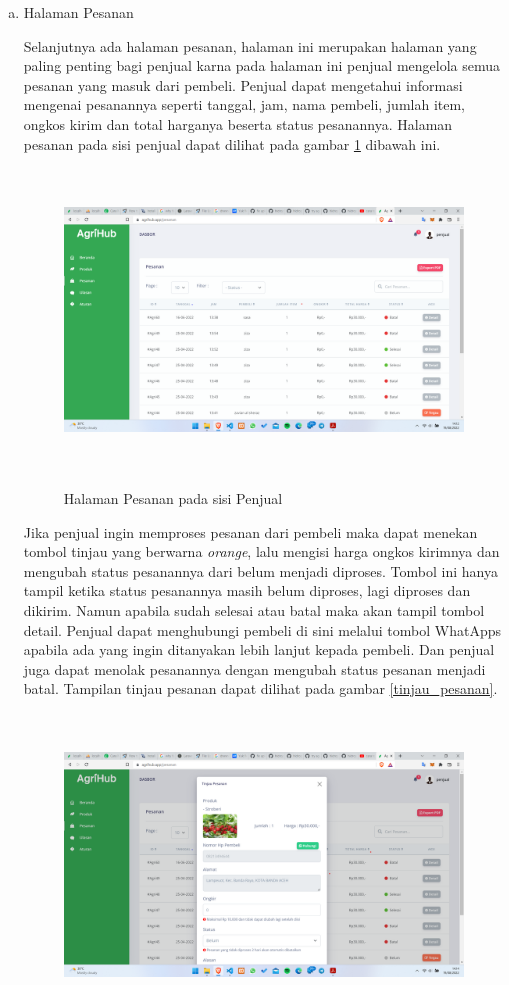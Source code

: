 \begin{enumerate}
\begin{enumerate}[a.]
		\item Halaman Pesanan
		\par Selanjutnya ada halaman pesanan, halaman ini merupakan halaman yang paling penting bagi penjual karna pada halaman ini penjual mengelola semua pesanan yang masuk dari pembeli. Penjual dapat mengetahui informasi mengenai pesanannya seperti tanggal, jam, nama pembeli, jumlah item, ongkos kirim dan total harganya beserta status pesanannya. Halaman pesanan pada sisi penjual dapat dilihat pada gambar \ref*{pesanan_penjual} dibawah ini.
		\begin{figure}[H]
			\centering
			{\includegraphics [width = 13.5cm, height= 8cm]{gambar/penjual/pesanan_penjual}}
			\caption{Halaman Pesanan pada sisi Penjual}
			\label{pesanan_penjual}
		\end{figure}
		\newpage
		\par Jika penjual ingin memproses pesanan dari pembeli maka dapat menekan tombol tinjau yang berwarna \textit{orange}, lalu mengisi harga ongkos kirimnya dan mengubah status pesanannya dari belum menjadi diproses. Tombol ini hanya tampil ketika status pesanannya masih belum diproses, lagi diproses dan dikirim. Namun apabila sudah selesai atau batal maka akan tampil tombol detail. Penjual dapat menghubungi pembeli di sini melalui tombol WhatApps apabila ada yang ingin ditanyakan lebih lanjut kepada pembeli. Dan penjual juga dapat menolak pesanannya dengan mengubah status pesanan menjadi batal. Tampilan tinjau pesanan dapat dilihat pada gambar \ref*{tinjau_pesanan}.
		\begin{figure}[H]
			\centering
			{\includegraphics [width = 13.5cm, height= 8cm]{gambar/penjual/tinjau_pesanan}}

\end{figure}
\end{enumerate}
\end{enumerate}
